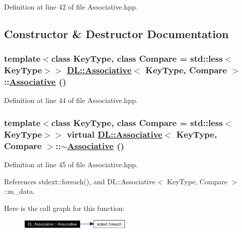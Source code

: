 Definition at line 42 of file Associative.hpp.

\subsection{Constructor \& Destructor Documentation}
\hypertarget{classDL_1_1Associative_a0}{
\subsubsection[Associative]{\setlength{\rightskip}{0pt plus 5cm}template$<$class Key\-Type, class Compare = std::less$<$Key\-Type$>$$>$ \hyperlink{classDL_1_1Associative}{DL::Associative}$<$ Key\-Type, Compare $>$::\hyperlink{classDL_1_1Associative}{Associative} ()}}
\label{classDL_1_1Associative_a0}




Definition at line 44 of file Associative.hpp.\hypertarget{classDL_1_1Associative_a1}{
\subsubsection[$\sim$Associative]{\setlength{\rightskip}{0pt plus 5cm}template$<$class Key\-Type, class Compare = std::less$<$Key\-Type$>$$>$ virtual \hyperlink{classDL_1_1Associative}{DL::Associative}$<$ Key\-Type, Compare $>$::$\sim$\hyperlink{classDL_1_1Associative}{Associative} ()}}
\label{classDL_1_1Associative_a1}




Definition at line 45 of file Associative.hpp.

References stdext::foreach(), and DL::Associative$<$ Key\-Type, Compare $>$::m\_\-data.

Here is the call graph for this function:\begin{figure}[H]
\begin{center}
\leavevmode
\includegraphics[width=151pt]{classDL_1_1Associative_a1_cgraph}
\end{center}
\end{figure}


